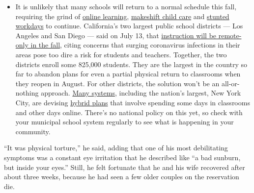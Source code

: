 \begin{itemize}
  \begin{itemize}
  \tightlist
  \item
    It is unlikely that many schools will return to a normal schedule
    this fall, requiring the grind of
    \href{https://www.nytimes3xbfgragh.onion/2020/06/05/us/coronavirus-education-lost-learning.html?action=click\&pgtype=Article\&state=default\&region=MAIN_CONTENT_3\&context=storylines_faq}{online
    learning},
    \href{https://www.nytimes3xbfgragh.onion/2020/05/29/us/coronavirus-child-care-centers.html?action=click\&pgtype=Article\&state=default\&region=MAIN_CONTENT_3\&context=storylines_faq}{makeshift
    child care} and
    \href{https://www.nytimes3xbfgragh.onion/2020/06/03/business/economy/coronavirus-working-women.html?action=click\&pgtype=Article\&state=default\&region=MAIN_CONTENT_3\&context=storylines_faq}{stunted
    workdays} to continue. California's two largest public school
    districts --- Los Angeles and San Diego --- said on July 13, that
    \href{https://www.nytimes3xbfgragh.onion/2020/07/13/us/lausd-san-diego-school-reopening.html?action=click\&pgtype=Article\&state=default\&region=MAIN_CONTENT_3\&context=storylines_faq}{instruction
    will be remote-only in the fall}, citing concerns that surging
    coronavirus infections in their areas pose too dire a risk for
    students and teachers. Together, the two districts enroll some
    825,000 students. They are the largest in the country so far to
    abandon plans for even a partial physical return to classrooms when
    they reopen in August. For other districts, the solution won't be an
    all-or-nothing approach.
    \href{https://bioethics.jhu.edu/research-and-outreach/projects/eschool-initiative/school-policy-tracker/}{Many
    systems}, including the nation's largest, New York City, are
    devising
    \href{https://www.nytimes3xbfgragh.onion/2020/06/26/us/coronavirus-schools-reopen-fall.html?action=click\&pgtype=Article\&state=default\&region=MAIN_CONTENT_3\&context=storylines_faq}{hybrid
    plans} that involve spending some days in classrooms and other days
    online. There's no national policy on this yet, so check with your
    municipal school system regularly to see what is happening in your
    community.
  \end{itemize}
\end{itemize}

``It was physical torture,'' he said, adding that one of his most
debilitating symptoms was a constant eye irritation that he described
like ``a bad sunburn, but inside your eyes.'' Still, he felt fortunate
that he and his wife recovered after about three weeks, because he had
seen a few older couples on the reservation die.

